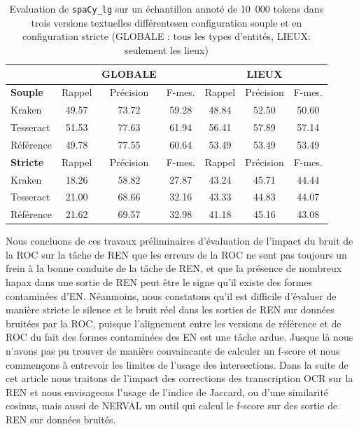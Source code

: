 \begin{table}[h!]
\centering
\scriptsize{\begin{tabular}{l|ccc|ccc}
 &		&	GLOBALE	&		&		&	LIEUX	&		\\
\hline
 \hline
\textbf{Souple}	&	Rappel		&Précision	&	F-mes.	&	Rappel&		Précision		&F-mes.	\\
 \hline
Kraken	&	49.57	&	73.72 	&	59.28	&	48.84	&	52.50	&	50.60	\\
													
Tesseract	&	51.53	&	77.63	&	61.94	&	56.41	&	57.89	&	57.14	\\
													
Référence	&	49.78	&	77.55	&	60.64	&	53.49	&	53.49	&	53.49	\\
\hline
\hline
\textbf{Stricte}	&	Rappel		&Précision	&	F-mes.	&	Rappel&		Précision		&F-mes.	 \\
\hline
Kraken	&	18.26	&	58.82	&	27.87	&	43.24	&	45.71	&	44.44	\\
Tesseract	&	21.00	&	68.66	&	32.16	&	43.33	&	44.83	&	44.07	\\
Référence	&	21.62	&	69.57	&	32.98	&	41.18	&	45.16	&	43.08	\\
\hline
\hline
\end{tabular}}
\caption{Evaluation de \texttt{spaCy\_lg} sur un échantillon annoté de 10~000 tokens dans trois versions textuelles différentes\label{tab:eval-supervise} en configuration souple et en configuration stricte (GLOBALE : tous les types d'entités, LIEUX: seulement les lieux)}
 \end{table}

Nous concluons de ces travaux préliminaires d'évaluation de l'impact du bruit de la ROC sur la tâche de REN que les erreurs de la ROC ne sont pas toujours un frein à la bonne conduite de la tâche de REN, et que la présence de nombreux hapax dans une sortie de REN peut être le signe qu'il existe des formes contaminées d'EN. Néanmoins, nous constatons qu'il est difficile d'évaluer de manière stricte le silence et le bruit réel dans les sorties de REN sur données bruitées par la ROC, puisque l'alignement entre les versions de référence et de ROC du fait des formes contaminées des EN est une tâche ardue. Jusque là nous n'avons pas pu trouver de manière convaincante de calculer un f-score et nous commençons à entrevoir les limites de l'usage des intersections.
Dans la suite de cet article nous traitons de l'impact des corrections des transcription OCR sur la REN et nous envisageons l'usage de l'indice de Jaccard, ou d'une similarité cosinus, mais aussi de NERVAL un outil qui calcul le f-score sur des sortie de REN sur données bruités. 


